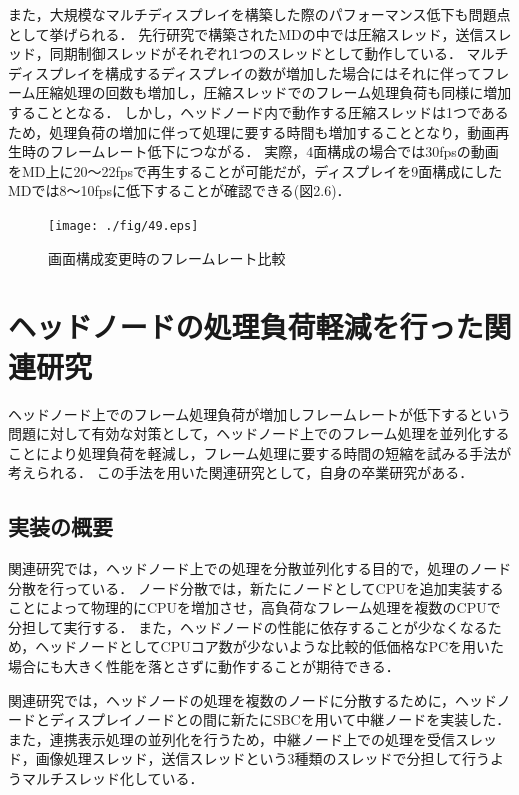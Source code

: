 また，大規模なマルチディスプレイを構築した際のパフォーマンス低下も問題点として挙げられる．
先行研究で構築されたMDの中では圧縮スレッド，送信スレッド，同期制御スレッドがそれぞれ1つのスレッドとして動作している．
マルチディスプレイを構成するディスプレイの数が増加した場合にはそれに伴ってフレーム圧縮処理の回数も増加し，圧縮スレッドでのフレーム処理負荷も同様に増加することとなる．
しかし，ヘッドノード内で動作する圧縮スレッドは1つであるため，処理負荷の増加に伴って処理に要する時間も増加することとなり，動画再生時のフレームレート低下につながる．
実際，4面構成の場合では30fpsの動画をMD上に20〜22fpsで再生することが可能だが，ディスプレイを9面構成にしたMDでは8〜10fpsに低下することが確認できる(図2.6)．

\begin{figure}[H]
  \hspace*{\fill}
  \texttt{[image: ./fig/49.eps]}
  \hspace*{\fill}
  \label{fig_2.6}
  \caption{画面構成変更時のフレームレート比較}
 \end{figure}


 \section{ヘッドノードの処理負荷軽減を行った関連研究}
 
ヘッドノード上でのフレーム処理負荷が増加しフレームレートが低下するという問題に対して有効な対策として，ヘッドノード上でのフレーム処理を並列化することにより処理負荷を軽減し，フレーム処理に要する時間の短縮を試みる手法が考えられる．
この手法を用いた関連研究として，自身の卒業研究がある．

\subsection*{実装の概要}

関連研究では，ヘッドノード上での処理を分散並列化する目的で，処理のノード分散を行っている．
ノード分散では，新たにノードとしてCPUを追加実装することによって物理的にCPUを増加させ，高負荷なフレーム処理を複数のCPUで分担して実行する．
また，ヘッドノードの性能に依存することが少なくなるため，ヘッドノードとしてCPUコア数が少ないような比較的低価格なPCを用いた場合にも大きく性能を落とさずに動作することが期待できる．

関連研究では，ヘッドノードの処理を複数のノードに分散するために，ヘッドノードとディスプレイノードとの間に新たにSBCを用いて中継ノードを実装した．
また，連携表示処理の並列化を行うため，中継ノード上での処理を受信スレッド，画像処理スレッド，送信スレッドという3種類のスレッドで分担して行うようマルチスレッド化している．


